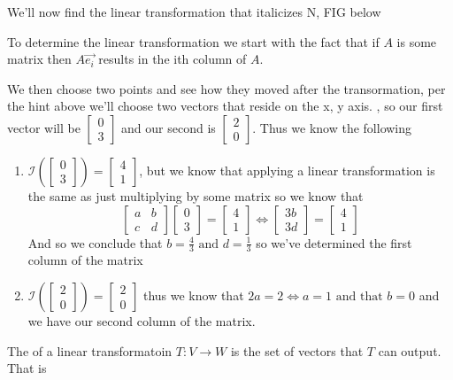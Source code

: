 \documentclass[notoc,notitlepage]{tufte-book}
\newcommand\mat[1]{\begin{bmatrix}#1\end{bmatrix}}
\begin{document}
\begin{ex}
    We'll now find the linear transformation that italicizes N, FIG below

    To determine the linear transformation we start with the fact that if $A$ is some matrix then $A \vec{e_i} $ results in the ith column of $A$.

    We then choose two points and see how they moved after the transormation, per the hint above we'll choose two vectors that reside on the x, y axis. , so our first vector will be $\mat{ 0 \\ 3 }$ and our second is $\mat{ 2 \\ 0 }$. Thus we know the following
    \begin{enumerate}
        \item $\mathcal{I}\left(\mat{ 0 \\ 3 }\right) = \mat{ 4 \\ 1 }$, but we know that applying a linear transformation is the same as just multiplying by some matrix so we know that
            \begin{equation*}
                \mat{ a & b \\ c & d } \mat{ 0 \\ 3 } = \mat{ 4 \\ 1 } \Leftrightarrow \mat{ 3b \\ 3d } = \mat{ 4 \\ 1 }
            \end{equation*}
            And so we conclude that $b = \frac{4}{3} \text{ and } d = \frac{1}{3}$ so we've determined the first column of the matrix
        \item $\mathcal{I}\left(\mat{ 2 \\ 0 }\right) = \mat{ 2 \\ 0 }$ thus we know that $2a = 2 \Leftrightarrow a = 1 \text{ and that } b = 0$ and we have our second column of the matrix.
    \end{enumerate}
\end{ex}


\begin{defn}[Range]\label{defn:range}
    The  of a linear transformatoin $T : V \to W $ is the set of
    vectors that $T$ can output. That is 
\end{defn}


\appendix

\backmatter

\fancyhead[LE]{\thepage \enspace \textsl{\leftmark}}

\nocite{*}



\printindex
\end{document}
